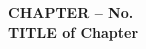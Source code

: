 \vspace*{\fill}
\begin{center}
\Huge \textbf{CHAPTER – No.} \\[10pt] %
\LARGE \textbf{TITLE of Chapter}
\end{center}
\vspace*{\fill}



